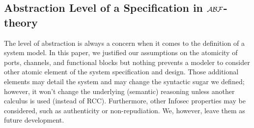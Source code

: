 \subsection{Abstraction Level of a Specification in $\mathcal{A}\mathcal{B}\mathcal{F}$-theory}
The level of abstraction is always a concern when it comes to the definition of
a system model.  In this paper, we justified our assumptions on the atomicity
of ports, channels, and functional blocks but nothing prevents a modeler to
consider other atomic element of the system specification and design.  Those
additional elements may detail the system and may change the syntactic sugar we
defined; however, it won't change the underlying (semantic) reasoning unless
another calculus is used (instead of RCC).  Furthermore, other Infosec
properties may be considered, such as authenticity or non-repudiation. We,
however, leave them as future development.
